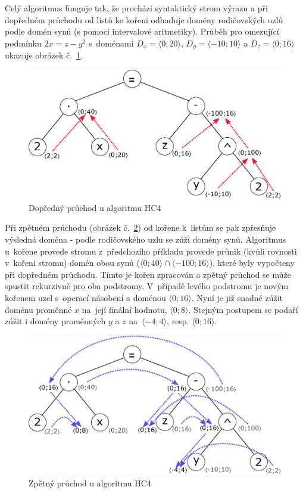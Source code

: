Celý algoritmus funguje tak, že prochází syntaktický strom výrazu a při dopředném průchodu od listů ke kořeni odhaduje domény rodičovských uzlů podle domén synů (s pomocí intervalové aritmetiky). Průběh pro omezující podmínku $2x = z - y^2$ s~doménami $D_x = \langle 0;20\rangle$, $D_y = \langle -10;10\rangle$ a $D_z = \langle 0;16\rangle$ ukazuje obrázek č.~\ref{img:forwardPropag}.

\begin{figure}
\centering
\includegraphics[scale=.65]{img/forwardPropag.eps}
\caption{Dopředný průchod u algoritmu HC4}
\label{img:forwardPropag}
\end{figure}

Při zpětném průchodu (obrázek č.~\ref{img:backwardPropag}) od kořene k~listům se pak zpřesňuje výsledná doména - podle rodičovského uzlu se zúží domény synů. Algoritmus u~kořene provede stromu z~předchozího příkladu provede průnik (kvůli rovnosti v~kořeni stromu) domén obou synů ($\langle 0;40\rangle \cap \langle -100;16\rangle$), které byly vypočteny při dopředném průchodu. Tímto je kořen zpracován a zpětný průchod se může spustit rekurzivně pro oba podstromy. V~případě levého podstromu je novým kořenem uzel s~operací násobení a doménou $\langle 0;16 \rangle$. Nyní je již snadné zúžit doménu proměnné $x$ na~její finální hodnotu, $\langle 0;8 \rangle$. Stejným postupem se podaří zúžit i domény proměnných $y$ a $z$ na~$\langle -4;4 \rangle$, resp. $\langle 0;16 \rangle$.

\begin{figure}
\centering
\includegraphics[scale=.65]{img/backwardPropag.eps}
\caption{Zpětný průchod u algoritmu HC4}
\label{img:backwardPropag}
\end{figure}








